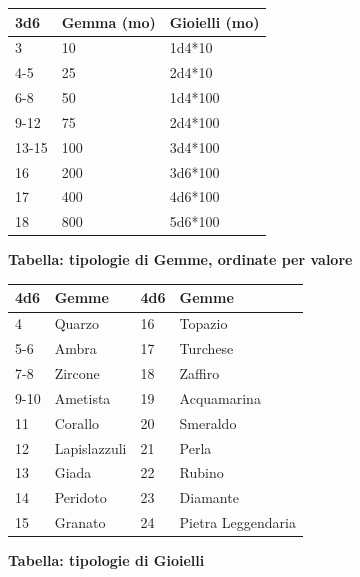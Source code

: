 \begin{multicols}{2}
{\noindent\begin{tabularx}{\linewidth}{Xl|l}
	\toprule
 \rowcolor{gray!20}\textbf{3d6}&\textbf{Gemma (mo)}&\textbf{Gioielli (mo)}\\
\toprule
	3&10& 1d4*10\\
 \rowcolor{gray!20}4-5&25& 2d4*10\\
	6-8&50& 1d4*100\\
 \rowcolor{gray!20}9-12&75& 2d4*100\\
	13-15&100& 3d4*100\\
 \rowcolor{gray!20}16&200& 3d6*100\\
	17&400& 4d6*100\\
 \rowcolor{gray!20}18&800& 5d6*100\\
\end{tabularx}

\medskip

\textbf{Tabella: tipologie di Gemme, ordinate per valore}

\noindent\begin{tabularx}{\linewidth}{l|l|l|l}
	\toprule
  \rowcolor{gray!20}\textbf{4d6} & \textbf{Gemme} & \textbf{4d6} & \textbf{Gemme} \\
\toprule
		4 & Quarzo & 16 &  Topazio\\
  \rowcolor{gray!20}5-6 & Ambra & 17 & Turchese \\
		7-8 & Zircone & 18 & Zaffiro \\
  \rowcolor{gray!20}9-10 & Ametista & 19 &  Acquamarina\\
		11 & Corallo & 20 & Smeraldo \\
  \rowcolor{gray!20}12 & Lapislazzuli & 21 & Perla \\
		13 & Giada & 22 & Rubino\\
  \rowcolor{gray!20}14 & Peridoto & 23 &  Diamante\\
		15 & Granato & 24 & Pietra Leggendaria\\
\end{tabularx}

\textbf{Tabella: tipologie di Gioielli}

\medskip

}
\end{multicols}
